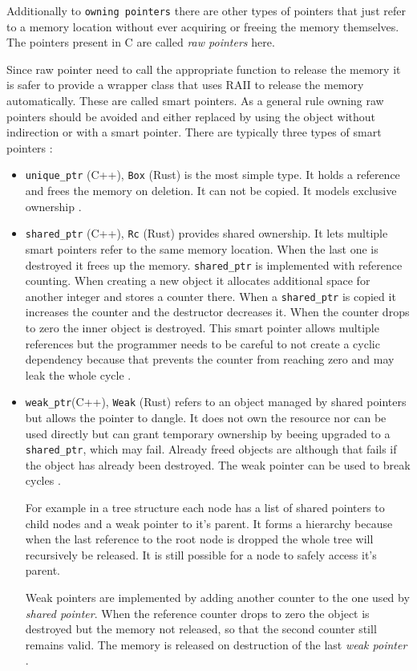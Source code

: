 \documentclass[conference,twocolumn]{IEEEtran}
\begin{document}
Additionally to \verb|owning pointers| there are other types of pointers that just refer to a memory location without ever acquiring or freeing the memory themselves. The pointers present in C are called \emph{raw pointers} here.

Since raw pointer need to call the appropriate function to release the memory it is safer to provide a wrapper class that uses RAII to release the memory automatically. These are called smart pointers. As a general rule owning raw pointers should be avoided and either replaced by using the object without indirection or with a smart pointer. There are typically three types of smart pointers \cite{meyers2014effective}:

\begin{itemize}
\item
\verb|unique_ptr| (C++), \verb|Box| (Rust) is the most simple type. It holds a reference and frees the memory on deletion. It can not be copied. It models exclusive ownership \cite{meyers2014effective}.

\item
\verb|shared_ptr| (C++), \verb|Rc| (Rust) provides shared ownership. It lets multiple smart pointers refer to the same memory location. When the last one is destroyed it frees up the memory. \verb|shared_ptr| is implemented with reference counting. When creating a new object it allocates additional space for another integer and stores a counter there. When a \verb|shared_ptr| is copied it increases the counter and the destructor decreases it. When the counter drops to zero the inner object is destroyed. This smart pointer allows multiple references but the programmer needs to be careful to not create a cyclic dependency because that prevents the counter from reaching zero and may leak the whole cycle \cite{meyers2014effective}.

\item \verb|weak_ptr|(C++), \verb|Weak| (Rust) refers to an object managed by shared pointers but allows the pointer to dangle. It does not own the resource nor can be used directly but can grant temporary ownership by beeing upgraded to a \verb|shared_ptr|, which may fail. Already freed objects are although that fails if the object has already been destroyed. The weak pointer can be used to break cycles \cite{meyers2014effective}.

For example in a tree structure each node has a list of shared pointers to child nodes and a weak pointer to it's parent. It forms a hierarchy because when the last reference to the root node is dropped the whole tree will recursively be released. It is still possible for a node to safely access it's parent.

Weak pointers are implemented by adding another counter to the one used by \emph{shared pointer}. When the reference counter drops to zero the object is destroyed but the memory not released, so that the second counter still remains valid. The memory is released on destruction of the last \emph{weak pointer} \cite{meyers2014effective}.
\end{itemize}
\end{document}
